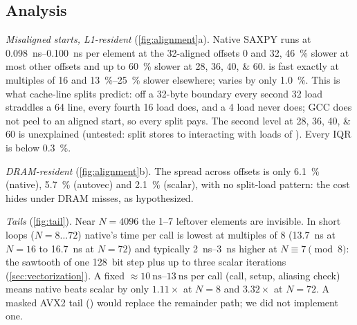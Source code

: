 \subsection{Analysis}
\emph{Misaligned starts, L1-resident} (\cref{fig:alignment}a). Native SAXPY runs at
\qtyrange{0.098}{0.100}{\nano\second} per element at the \qty{32}{\byte}-aligned offsets $0$ and
\num{32}, \SI{46}{\percent} slower at most other offsets and up to \SI{60}{\percent} slower at
\numlist{28;36;40;60}.  is fast exactly at multiples of \num{16} and
\SIrange{13}{25}{\percent} slower elsewhere;  varies by only \SI{1.0}{\percent}. This is
what cache-line splits predict: off a 32-byte boundary every second \qty{32}{\byte} load straddles a
\qty{64}{\byte} line, every fourth \qty{16}{\byte} load does, and a \qty{4}{\byte} load never does;
GCC does not peel to an aligned start, so every split pays. The second level at
\numlist{28;36;40;60} is unexplained (untested: split stores to  interacting with loads of
). Every IQR is below \SI{0.3}{\percent}.

\emph{DRAM-resident} (\cref{fig:alignment}b). The spread across offsets is only \SI{6.1}{\percent}
(native), \SI{5.7}{\percent} (autovec) and \SI{2.1}{\percent} (scalar), with no split-load pattern:
the cost hides under DRAM misses, as hypothesized.

\emph{Tails} (\cref{fig:tail}). Near $N=\num{4096}$ the \numrange{1}{7} leftover elements are
invisible. In short loops ($N=8\ldots72$) native's time per call is lowest at multiples of \num{8}
(\qty{13.7}{\nano\second} at $N=16$ to \qty{16.7}{\nano\second} at $N=72$) and typically
\qtyrange{2}{3}{\nano\second} higher at $N\equiv7 \pmod 8$: the sawtooth of one \qty{128}{bit} step
plus up to three scalar iterations (\cref{sec:vectorization}). A fixed $\approx\qtyrange{10}{13}{\nano\second}$ per call (call, setup, aliasing check)
means native beats scalar by only $1.11\times$ at $N=8$ and $3.32\times$ at $N=72$. A masked AVX2
tail () would replace the remainder path; we did not implement one.
